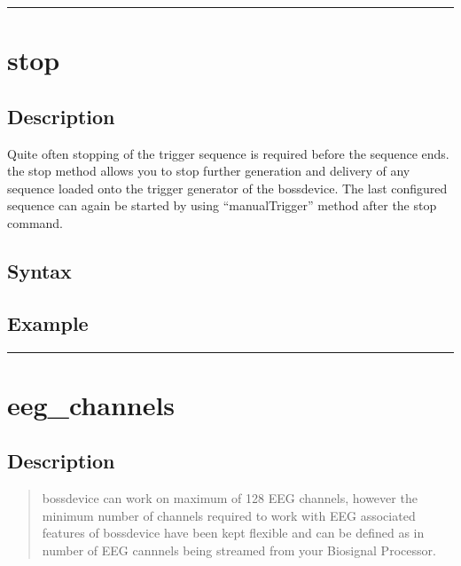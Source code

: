 \documentclass[letterpaper,10pt,english]{sphinxmanual}
\begin{document}
\bigskip\hrule\bigskip



\section{stop}
\label{\detokenize{4_api_documentation:stop}}

\subsection{Description}
\label{\detokenize{4_api_documentation:id10}}
Quite often stopping of the trigger sequence is required before the sequence ends. the stop method allows you to stop further generation and delivery of any sequence loaded onto the trigger generator of the bossdevice.
The last configured sequence can again be started by using “manualTrigger” method after the stop command.


\subsection{Syntax}
\label{\detokenize{4_api_documentation:id11}}
\begin{sphinxVerbatim}[commandchars=\\\{\}]
 
\end{sphinxVerbatim}


\subsection{Example}
\label{\detokenize{4_api_documentation:id12}}
\begin{sphinxVerbatim}[commandchars=\\\{\}]
\end{sphinxVerbatim}


\bigskip\hrule\bigskip



\section{eeg\_channels}
\label{\detokenize{4_api_documentation:eeg-channels}}

\subsection{Description}
\label{\detokenize{4_api_documentation:id13}}\begin{quote}

bossdevice can work on maximum of 128 EEG channels, however the minimum number of channels required to work with EEG associated features of bossdevice have been kept flexible and can be defined as in number of EEG cannnels being streamed from your Biosignal Processor.
\end{quote}
\end{document}
